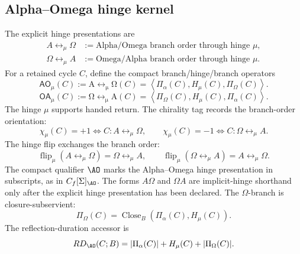 \subsection{Alpha--Omega hinge kernel}
\label{subsec:ao-kernel}
\begin{definition}
The explicit hinge presentations are
\begin{align*}
A\leftrightarrow_{\mu}\Omega
&:=
\text{Alpha/Omega branch order through hinge }\mu,\\
\Omega\leftrightarrow_{\mu}A
&:=
\text{Omega/Alpha branch order through hinge }\mu.
\end{align*}
For a retained cycle \(C\), define the compact branch/hinge/branch operators
\begin{equation}
\mathsf{AO}_{\mu}(C)
:=
\operatorname{A\leftrightarrow_{\mu}\Omega}(C)
=
\left\langle
\Pi_\alpha(C),
H_\mu(C),
\Pi_\Omega(C)
\right\rangle.
\label{eq:ao-kernel}
\end{equation}
\begin{equation}
\mathsf{OA}_{\mu}(C)
:=
\operatorname{\Omega\leftrightarrow_{\mu}A}(C)
=
\left\langle
\Pi_\Omega(C),
H_\mu(C),
\Pi_\alpha(C)
\right\rangle.
\label{eq:omega-alpha-hinge-kernel}
\end{equation}
The hinge \(\mu\) supports handed return. The chirality tag records the branch-order orientation:
\begin{equation}
\chi_\mu(C)=+1
\Longleftrightarrow
C:A\leftrightarrow_{\mu}\Omega,
\qquad
\chi_\mu(C)=-1
\Longleftrightarrow
C:\Omega\leftrightarrow_{\mu}A.
\label{eq:hinge-chirality-tag}
\end{equation}
The hinge flip exchanges the branch order:
\begin{equation}
\operatorname{flip}_\mu(A\leftrightarrow_{\mu}\Omega)=\Omega\leftrightarrow_{\mu}A,
\qquad
\operatorname{flip}_\mu(\Omega\leftrightarrow_{\mu}A)=A\leftrightarrow_{\mu}\Omega.
\label{eq:hinge-chirality-flip}
\end{equation}
The compact qualifier \(\AO\) marks the Alpha--Omega hinge presentation in subscripts, as in \(C_f[\Sigma]_{\AO}\). The forms \(A\Omega\) and \(\Omega A\) are implicit-hinge shorthand only after the explicit hinge presentation has been declared.
The \(\Omega\)-branch is closure-subservient:
\begin{equation}
\Pi_\Omega(C)=\operatorname{Close}_B(\Pi_\alpha(C),H_\mu(C)).
\label{eq:omega-close}
\end{equation}
The reflection-duration accessor is
\begin{equation}
RD_{\AO}(C;B)
=
|\Pi_\alpha(C)|+H_\mu(C)+|\Pi_\Omega(C)|.
\label{eq:ao-rd-accessor-kernel}
\end{equation}
\end{definition}

